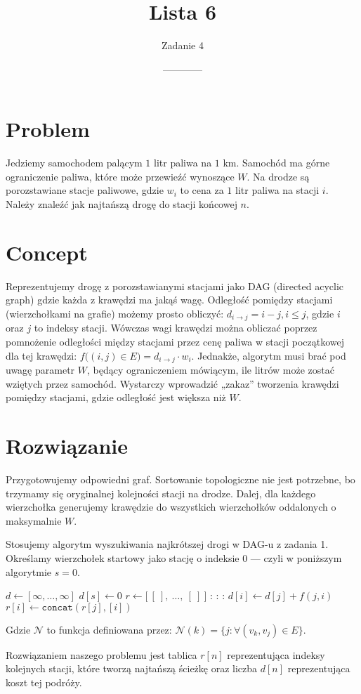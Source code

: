 \documentclass[14pt]{article}
\title{Lista 6}
\author{Zadanie 4}
\date{------------}
\begin{document}
\maketitle

\section{Problem}

Jedziemy samochodem palącym $1$ litr paliwa na $1$ km. Samochód ma górne ograniczenie paliwa, które może przewieźć wynoszące $W$. Na drodze są porozstawiane stacje paliwowe, gdzie $w_i$ to cena za $1$ litr paliwa na stacji $i$.
Należy znaleźć jak najtańszą drogę do stacji końcowej $n$.

\section{Concept}

Reprezentujemy drogę z porozstawianymi stacjami jako DAG (directed acyclic graph) gdzie każda z krawędzi ma jakąś wagę. Odległość pomiędzy stacjami (wierzchołkami na grafie) możemy prosto obliczyć: $d_{i\to j} = i-j, i\le j$, gdzie $i$ oraz $j$ to indeksy stacji.
Wówczas wagi krawędzi można obliczać poprzez pomnożenie odległości między stacjami przez cenę paliwa w stacji początkowej dla tej krawędzi: $f\big((i,j)\in E\big) = d_{i\to j} \cdot w_i$. Jednakże, algorytm musi brać pod uwagę parametr $W$, będący ograniczeniem mówiącym, ile litrów może zostać wziętych przez samochód. Wystarczy wprowadzić „zakaz” tworzenia krawędzi pomiędzy stacjami, gdzie odległość jest większa niż $W$.

\section{Rozwiązanie}

Przygotowujemy odpowiedni graf. Sortowanie topologiczne nie jest potrzebne, bo trzymamy się oryginalnej kolejności stacji na drodze. Dalej, dla każdego wierzchołka generujemy krawędzie do wszystkich wierzchołków oddalonych o maksymalnie $W$.

Stosujemy algorytm wyszukiwania najkrótszej drogi w DAG-u z zadania 1. Określamy wierzchołek startowy jako stację o indeksie $0$ — czyli w poniższym algorytmie $s = 0$.

\begin{algorithm}[H]
  \begin{algorithmic}[1]
    \State $d \gets [\infty,\dots,\infty]$
    \State $d[s] \gets 0$
    \State $r \gets \big[~[~],~\dots,~[~]~\big]$
    :
      :
        :
          \State $d[i] \gets d[j] + f(j,i)$
          \State $r[i] \gets \texttt{concat}(r[j], [i])$
        \EndIf
      \EndFor
    \EndFor
  \end{algorithmic}
\end{algorithm}
Gdzie $\mathcal{N}$ to funkcja definiowana przez:
$\mathcal{N}(k) = \{j: \forall(v_k,v_j) \in E\}.$

Rozwiązaniem naszego problemu jest tablica $r[n]$ reprezentująca indeksy kolejnych stacji, które tworzą najtańszą ścieżkę oraz liczba $d[n]$ reprezentująca koszt tej podróży.
\end{document}
